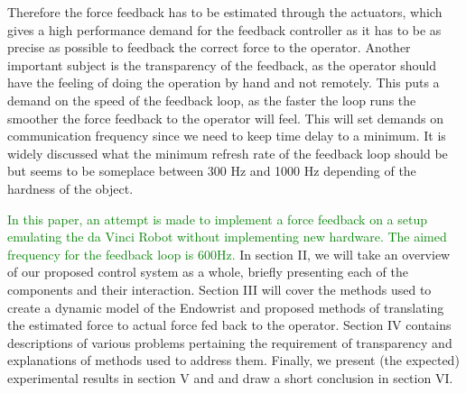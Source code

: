 Therefore the force feedback has to be estimated through the actuators, which gives a high performance demand for the feedback controller as it has to be as precise as possible to feedback the correct force to the operator. Another important subject is the transparency of the feedback, as the operator should have the feeling of doing the operation by hand and not remotely. This puts a demand on the speed of the feedback loop, as the faster the loop runs the smoother the force feedback to the operator will feel. This will set demands on communication frequency since we need to keep time delay to a minimum. It is widely discussed what the minimum refresh rate of the feedback loop should be but seems to be someplace between 300 Hz and 1000 Hz depending of the hardness of the object\cite{coles2011role}.

\textcolor{green}{In this paper, an attempt is made to implement a force feedback on a setup emulating the da Vinci Robot without implementing new hardware. The aimed frequency for the feedback loop is 600Hz.}
In section II, we will take an overview of our proposed control system as a whole, briefly presenting each of the components and their interaction.
Section III will cover the methods used to create a dynamic model of the Endowrist and proposed methods of translating the estimated force to actual force fed back to the operator.
Section IV contains descriptions of various problems pertaining the requirement of transparency and explanations of methods used to address them.
Finally,  we present (the expected) experimental results in section V and and draw a short conclusion in section VI.






